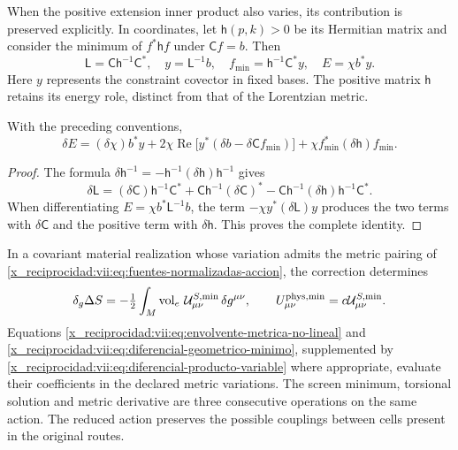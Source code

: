 When the positive extension inner product also varies, its
contribution is preserved explicitly. In coordinates, let
\(\mathsf h(p,k)>0\) be its Hermitian matrix and consider the minimum
of \(f^*\mathsf h f\) under \(\mathsf C f=b\). Then
\begin{equation}
 \mathsf L=\mathsf C\mathsf h^{-1}\mathsf C^*,\quad
 y=\mathsf L^{-1}b,\quad
 f_{\min}=\mathsf h^{-1}\mathsf C^*y,\quad
 E=\chi b^*y.
 \label{x_reciprocidad:vii:eq:minimo-producto-variable}
\end{equation}
Here \(y\) represents the constraint covector in fixed
bases. The positive matrix \(\mathsf h\) retains its energy
role, distinct from that of the Lorentzian metric.

\begin{lemma}
\label{x_reciprocidad:vii:lem:producto-variable-extension}
With the preceding conventions,
\begin{equation}
 \delta E=(\delta\chi)b^*y
   +2\chi\operatorname{Re}\bigl[y^*(\delta b-\delta\mathsf C f_{\min})\bigr]
   +\chi f_{\min}^*(\delta\mathsf h)f_{\min}.
 \label{x_reciprocidad:vii:eq:diferencial-producto-variable}
\end{equation}
\end{lemma}
\begin{proof}
The formula \(\delta\mathsf h^{-1}
=-\mathsf h^{-1}(\delta\mathsf h)\mathsf h^{-1}\) gives
\[
 \delta\mathsf L=(\delta\mathsf C)\mathsf h^{-1}\mathsf C^*
 +\mathsf C\mathsf h^{-1}(\delta\mathsf C)^*
 -\mathsf C\mathsf h^{-1}(\delta\mathsf h)
                              \mathsf h^{-1}\mathsf C^*.
\]
When differentiating \(E=\chi b^*\mathsf L^{-1}b\), the term
\(-\chi y^*(\delta\mathsf L)y\) produces the two terms
with \(\delta\mathsf C\) and the positive term with
\(\delta\mathsf h\). This proves the complete identity.
\end{proof}

In a covariant material realization whose variation admits the
metric pairing of
\eqref{x_reciprocidad:vii:eq:fuentes-normalizadas-accion}, the correction determines
\begin{equation}
 \delta_g\Delta S
 =-\tfrac12\int_M\operatorname{vol}_e\,
          \mathcal U^{S,\min}_{\mu\nu}\,\delta g^{\mu\nu},
 \qquad U^{\rm phys,\min}_{\mu\nu}
                      =c\mathcal U^{S,\min}_{\mu\nu}.
 \label{x_reciprocidad:vii:eq:fuente-metrica-minimo-no-lineal}
\end{equation}
Equations \eqref{x_reciprocidad:vii:eq:envolvente-metrica-no-lineal} and
\eqref{x_reciprocidad:vii:eq:diferencial-geometrico-minimo}, supplemented by
\eqref{x_reciprocidad:vii:eq:diferencial-producto-variable} where appropriate,
evaluate their coefficients in the declared metric variations.
The screen minimum, torsional solution and metric derivative
are three consecutive operations on the same action.
The reduced action preserves the possible couplings between
cells present in the original routes.

